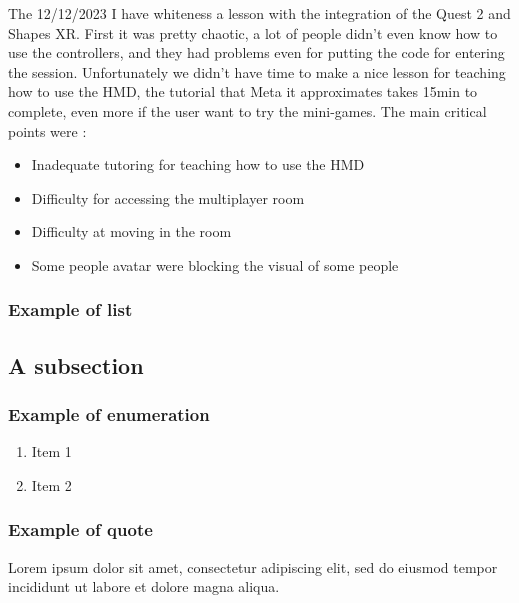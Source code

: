 The 12/12/2023 I have whiteness a lesson with the integration of the Quest 2 and Shapes XR.
First it was pretty chaotic, a lot of people didn’t even know how to use the controllers, and they had problems even for putting the code for entering the session.
Unfortunately we didn’t have time to make a nice lesson for teaching how to use the \ac{HMD}, the tutorial that Meta it approximates takes 15min to complete, even more if the user want to try the mini-games.
The main critical points were :

\begin{itemize}
  \item Inadequate tutoring for teaching how to use the \ac{HMD}
  \item Difficulty for accessing the multiplayer room
  \item Difficulty at moving in the room
  \item Some people avatar were blocking the visual of some people
\end{itemize}

\subsubsection{Example of list}


\subsection{A subsection}


\subsubsection{Example of enumeration}
\begin{enumerate}
  \item Item 1
  \item Item 2
\end{enumerate}

\subsubsection{Example of quote}
\begin{displayquote}
Lorem ipsum dolor sit amet, consectetur adipiscing elit, sed do eiusmod tempor incididunt ut labore et dolore magna aliqua.
\end{displayquote}
